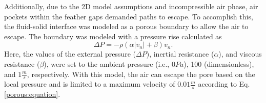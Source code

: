 \documentclass[%
 aip,
 amsmath,amssymb,
 reprint,%
]{revtex4-1}
\begin{document}
Additionally, due to the 2D model assumptions and incompressible air phase, air pockets within the feather gaps demanded paths to escape. To accomplish this, %
the fluid-solid interface
was modeled as %
a porous boundary to allow the air to escape. The boundary was modeled with a pressure rise calculated as
\begin{equation}
\label{porous:equation}
    \Delta P = -\rho (\alpha |v_n| + \beta)v_n.
\end{equation}
Here, the values of the external pressure ($\Delta P$), inertial resistance ($\alpha$), and viscous resistance ($\beta$), were set to the ambient pressure (i.e., $0 Pa$), 100 (dimensionless), and $1 \frac{m}{s}$, respectively. With this model, the air can escape the pore based on the local pressure and is limited to a maximum velocity of $0.01 \frac{m}{s}$ according to Eq. \ref{porous:equation}.






\end{document}
